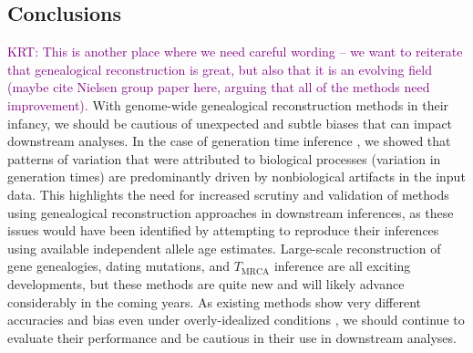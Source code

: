 \documentclass[]{article}
\newcommand{\krtcomment}[1]{{\textcolor{purple}{KRT: #1}}}
\begin{document}
\subsection*{Conclusions}

\krtcomment{This is another place where we need careful wording -- we want to
reiterate that genealogical reconstruction is great, but also that
it is an evolving field (maybe cite Nielsen group paper here, arguing that
all of the methods need improvement).}
With genome-wide genealogical reconstruction methods in their infancy, we
should be cautious of unexpected and subtle biases that can impact downstream
analyses. In the case of generation time inference \citep{wang2023human}, we
showed that patterns of variation that were attributed to biological processes
(variation in generation times) are predominantly driven by nonbiological
artifacts in the input data. This highlights the need for increased scrutiny
and validation of methods using genealogical reconstruction approaches in
downstream inferences, as these issues would have been identified by attempting
to reproduce their inferences using available independent allele age estimates.
Large-scale reconstruction of gene genealogies, dating mutations, and
$T_\text{MRCA}$ inference are all exciting developments, but these methods are
quite new and will likely advance considerably in the coming years. As existing
methods show very different accuracies and bias even under overly-idealized
conditions \citep{brandt2022evaluation}, we should continue to evaluate their
performance and be cautious in their use in downstream analyses.



\end{document}
